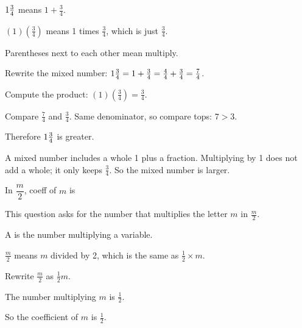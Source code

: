\begin{words}
  \item $1\tfrac{3}{4}$ means $1 + \tfrac{3}{4}$.
  \item $(1)\!\left(\tfrac{3}{4}\right)$ means 1 times $\tfrac{3}{4}$, which is just $\tfrac{3}{4}$.
  \item Parentheses next to each other mean multiply.
\end{words}

\begin{steps}
  \item Rewrite the mixed number: $1\tfrac{3}{4} = 1 + \tfrac{3}{4} = \tfrac{4}{4} + \tfrac{3}{4} = \tfrac{7}{4}$.
  \item Compute the product: $(1)\!\left(\tfrac{3}{4}\right) = \tfrac{3}{4}$.
  \item Compare $\tfrac{7}{4}$ and $\tfrac{3}{4}$. Same denominator, so compare tops: $7 > 3$.
  \item Therefore $1\tfrac{3}{4}$ is greater.
\end{steps}


A mixed number includes a whole 1 plus a fraction. Multiplying by 1 does not add a whole; it only keeps $\tfrac{3}{4}$. So the mixed number is larger.


In $\dfrac{m}{2}$, coeff of $m$ is \blank[1.8cm]


This question asks for the number that multiplies the letter $m$ in $\tfrac{m}{2}$.

\begin{words}
  \item A is the number multiplying a variable.
  \item $\tfrac{m}{2}$ means $m$ divided by 2, which is the same as $\tfrac{1}{2} \times m$.
\end{words}

\begin{steps}
  \item Rewrite $\tfrac{m}{2}$ as $\tfrac{1}{2}m$.
  \item The number multiplying $m$ is $\tfrac{1}{2}$.
  \item So the coefficient of $m$ is $\tfrac{1}{2}$.
\end{steps}

